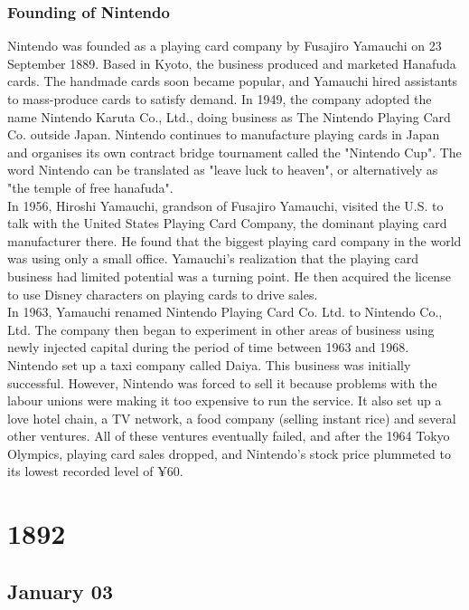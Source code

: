 \documentclass[11pt]{report}
\begin{document}
\subsection{Founding of Nintendo}
Nintendo was founded as a playing card company by Fusajiro Yamauchi on 23 September 1889. Based in Kyoto, the business produced and marketed Hanafuda cards. The handmade cards soon became popular, and Yamauchi hired assistants to mass-produce cards to satisfy demand. In 1949, the company adopted the name Nintendo Karuta Co., Ltd., doing business as The Nintendo Playing Card Co. outside Japan. Nintendo continues to manufacture playing cards in Japan and organises its own contract bridge tournament called the "Nintendo Cup". The word Nintendo can be translated as "leave luck to heaven", or alternatively as "the temple of free hanafuda".\\
\indent In 1956, Hiroshi Yamauchi, grandson of Fusajiro Yamauchi, visited the U.S. to talk with the United States Playing Card Company, the dominant playing card manufacturer there. He found that the biggest playing card company in the world was using only a small office. Yamauchi's realization that the playing card business had limited potential was a turning point. He then acquired the license to use Disney characters on playing cards to drive sales.\\
\indent In 1963, Yamauchi renamed Nintendo Playing Card Co. Ltd. to Nintendo Co., Ltd. The company then began to experiment in other areas of business using newly injected capital during the period of time between 1963 and 1968. Nintendo set up a taxi company called Daiya. This business was initially successful. However, Nintendo was forced to sell it because problems with the labour unions were making it too expensive to run the service. It also set up a love hotel chain, a TV network, a food company (selling instant rice) and several other ventures. All of these ventures eventually failed, and after the 1964 Tokyo Olympics, playing card sales dropped, and Nintendo's stock price plummeted to its lowest recorded level of ¥60.

\chapter{1892}
\section{January 03}
\end{document}
